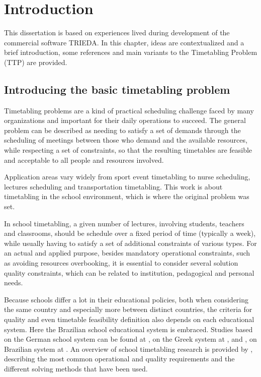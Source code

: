 \chapter{Introduction}
\label{chap:intro}


This dissertation is based on experiences lived during development of the commercial software TRIEDA. In this chapter, ideas are contextualized and a brief introduction, some references and main variants to the Timetabling Problem (TTP) are provided.

\section{Introducing the basic timetabling problem}

Timetabling problems are a kind of practical scheduling challenge faced by many organizations and important for their daily operations to succeed. The general problem can be described as needing to satisfy a set of demands through the scheduling of meetings between those who demand and the available resources, while respecting a set of constraints, so that the resulting timetables are feasible and acceptable to all people and resources involved. 

Application areas vary widely from sport event timetabling to nurse scheduling, lectures scheduling and transportation timetabling. This work is about timetabling in the school environment, which is where the original problem was set.

In school timetabling, a given number of lectures, involving students, teachers and classrooms, should be schedule over a fixed period of time (typically a week), while usually having to satisfy a set of additional constraints of various types. For an actual and applied purpose, besides mandatory operational constraints, such as avoiding resources overbooking, it is essential to consider several solution quality constraints, which can be related to institution, pedagogical and personal needs.

Because schools differ a lot in their educational policies, both when considering the same country and especially more between distinct countries, the criteria for quality and even timetable feasibility definition also depends on each educational system. Here the Brazilian school educational system is embraced. Studies based on the German school system can be found at \cite{Michael2002}, on the Greek system at \cite{Birbas1997}, \cite{Birbas2009} and \cite{VGAH2012}, on Brazilian system at \cite{Haroldo2012}. An overview of school timetabling research is provided by \cite{SchoolOverview2010}, describing the most common operational and quality requirements and the different solving methods that have been used.

